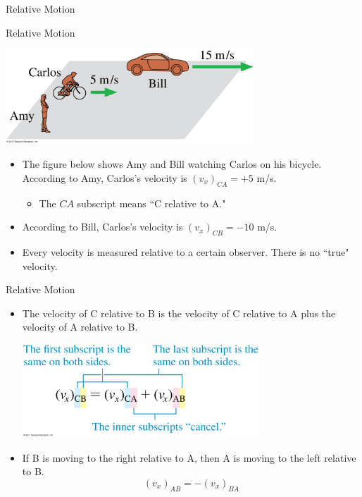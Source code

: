 \documentclass{beamer}
\begin{document}
\begin{frame}{Relative Motion}
\begin{center}
   \color{blue}{\Huge Relative Motion}
\end{center}
\end{frame}

\begin{frame}{Relative Motion}
\begin{center}
   \includegraphics[width=0.7\textwidth]{../figures/04_17_Figure.jpg}
\end{center}
\begin{itemize}
   \item<1-> The figure below shows Amy and Bill watching Carlos on his bicycle. According to Amy, Carlos's velocity is $(v_x)_{CA} = +5$ m/s.
   \begin{itemize}
      \item<1-> The $CA$ subscript means ``C relative to A."
   \end{itemize}
   \item<2-> According to Bill, Carlos's velocity is $(v_x)_{CB} = -10$ m/s.
   \item<3-> Every velocity is measured relative to a certain observer. There is no ``true" velocity.
\end{itemize}
\end{frame}

\begin{frame}{Relative Motion}
\begin{itemize}
   \item The velocity of C relative to B is the velocity of C relative to A plus the velocity of A relative to B.
   \begin{center}
      \includegraphics[width=0.7\textwidth]{../figures/EQ4_16.jpg}
   \end{center}
   \item If B is moving to the right relative to A, then A is moving to the left relative to B.
   \begin{equation*}
      (v_x)_{AB} = -(v_x)_{BA}
   \end{equation*}
\end{itemize}
\end{frame}
\end{document}
